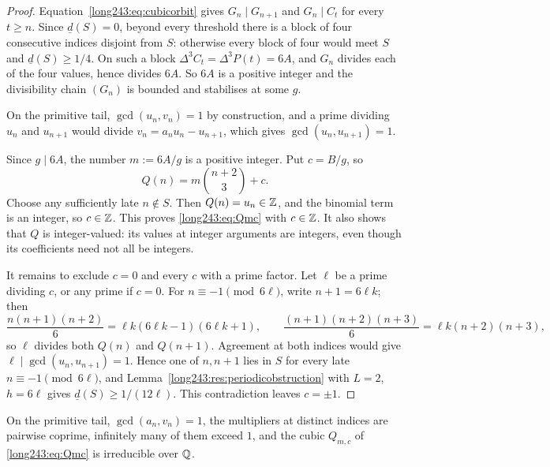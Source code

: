 \documentclass[11pt]{article}
\begin{document}
\begin{proof}
Equation~\eqref{long243:eq:cubicorbit} gives $G_n\mid G_{n+1}$ and $G_n\mid C_t$ for
every $t\ge n$.  Since $\underline d(S)=0$, beyond every threshold there is a block of four
consecutive indices disjoint from $S$: otherwise every block of four would meet
$S$ and $\underline d(S)\ge1/4$.  On such a block $\Delta^3C_t=\Delta^3P(t)=6A$, and
$G_n$ divides each of the four values, hence divides $6A$.  So $6A$
is a positive integer and the divisibility chain $(G_n)$ is bounded and
stabilises at some $g$.

On the primitive tail, $\gcd(u_n,v_n)=1$ by construction, and a prime dividing
$u_n$ and $u_{n+1}$ would divide $v_n=a_nu_n-u_{n+1}$, which gives
$\gcd(u_n,u_{n+1})=1$.

Since $g\mid6A$, the number $m:=6A/g$ is a positive integer. Put
$c=B/g$, so
\[
 Q(n)=m\binom{n+2}{3}+c.
\]
Choose any sufficiently late $n\notin S$. Then $Q(n)=u_n\in\mathbb{Z}$, and the
binomial term is an integer, so $c\in\mathbb{Z}$. This proves
\eqref{long243:eq:Qmc} with $c\in\mathbb{Z}$. It also shows that $Q$ is
integer-valued: its values at integer arguments are integers, even
though its coefficients need not all be integers.

It remains to exclude $c=0$ and every $c$ with a prime factor.  Let $\ell$ be a
prime dividing $c$, or any prime if $c=0$.  For $n\equiv-1\pmod{6\ell}$, write
$n+1=6\ell k$; then
\[
 \frac{n(n+1)(n+2)}6=\ell k(6\ell k-1)(6\ell k+1),
 \qquad
 \frac{(n+1)(n+2)(n+3)}6=\ell k(n+2)(n+3),
\]
so $\ell$ divides both $Q(n)$ and $Q(n+1)$.  Agreement at both indices would
give $\ell\mid\gcd(u_n,u_{n+1})=1$.  Hence one of $n,n+1$ lies in $S$ for every
late $n\equiv-1\pmod{6\ell}$, and Lemma~\ref{long243:res:periodicobstruction} with
$L=2$, $h=6\ell$ gives $\underline d(S)\ge1/(12\ell)$.  This contradiction
leaves $c=\pm1$.
\end{proof}

\begin{lemma}\label{long243:res:reduciblecase}
On the primitive tail, $\gcd(a_n,v_n)=1$, the multipliers at distinct indices
are pairwise coprime, infinitely many of them exceed $1$, and the cubic
$Q_{m,c}$ of \eqref{long243:eq:Qmc} is irreducible over $\mathbb{Q}$.
\end{lemma}
\end{document}
